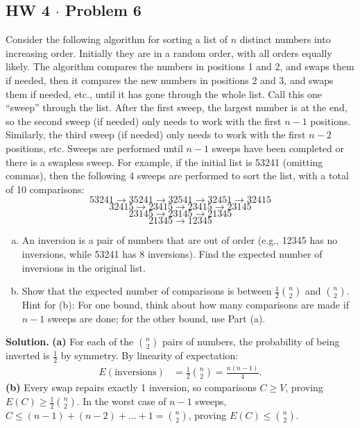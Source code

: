 \documentclass[11pt,a4paper]{article}
\begin{document}
\subsection{HW 4 $\cdot$ Problem 6}
\begin{tcolorbox}[title={HW 4 $\cdot$ Problem 6}]
Consider the following algorithm for sorting a list of $n$ distinct numbers into increasing order. Initially they are in a random order, with all orders equally likely.
The algorithm compares the numbers in positions 1 and 2, and swaps them if needed, then it compares the new numbers in positions 2 and 3, and swaps them if needed, etc., until it has gone through the whole list. Call this one ``sweep'' through the list. After the first sweep, the largest number is at the end, so the second sweep (if needed) only needs to work with the first $n-1$ positions. Similarly, the third sweep (if needed) only needs to work with the first $n-2$ positions, etc. Sweeps are performed until $n-1$ sweeps have been completed or there is a swapless sweep.
For example, if the initial list is 53241 (omitting commas), then the following 4 sweeps are performed to sort the list, with a total of 10 comparisons:
\[
53241 \rightarrow 35241 \rightarrow 32541 \rightarrow 32451 \rightarrow 32415
\]
\[
32415 \rightarrow 23415 \rightarrow 23415 \rightarrow 23145
\]
\[
23145 \rightarrow 23145 \rightarrow 21345
\]
\[
21345 \rightarrow 12345
\]
\begin{enumerate}[(a)]
\item An inversion is a pair of numbers that are out of order (e.g., 12345 has no inversions, while 53241 has 8 inversions). Find the expected number of inversions in the original list.
\item Show that the expected number of comparisons is between $\frac{1}{2}\binom{n}{2}$ and $\binom{n}{2}$.
Hint for (b): For one bound, think about how many comparisons are made if $n-1$ sweeps are done; for the other bound, use Part (a).
\end{enumerate}
\end{tcolorbox}

\noindent \textbf{Solution.} \textbf{(a)} For each of the $\binom{n}{2}$ pairs of numbers, the probability of being inverted is $\frac{1}{2}$ by symmetry. By linearity of expectation:
\begin{align*}
E(\text{inversions}) &= \frac{1}{2}\binom{n}{2} = \frac{n(n-1)}{4}.
\end{align*}
\textbf{(b)} Every swap repairs exactly 1 inversion, so comparisons $C \ge V$, proving $E(C) \ge \frac{1}{2}\binom{n}{2}$. In the worst case of $n-1$ sweeps, $C \le (n-1) + (n-2) + \dots + 1 = \binom{n}{2}$, proving $E(C) \le \binom{n}{2}$.
\end{document}
